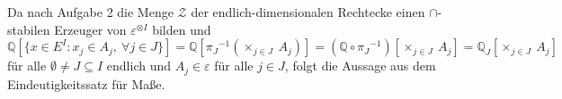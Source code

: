 Da nach Aufgabe 2 die Menge $\mathcal{Z}$ der endlich-dimensionalen Rechtecke einen $\cap$-stabilen Erzeuger von $\varepsilon^{ \otimes I}$ bilden und
\begin{equation*}
\mathbb{Q}[\lbrace x \in E^{I} : x_{j} \in A_{j}, \: \forall j \in J\rbrace] = \mathbb{Q}[{\pi_{J}}^{-1}(\times_{j \in J} \: A_{j})] = (\mathbb{Q} \circ {\pi_{J}}^{-1})[\times_{j \in J} \: A_{j}] = \mathbb{Q}_{J}[\times_{j \in J} \: A_{j}]  
\end{equation*}
für alle $\emptyset \neq J \subseteq I$ endlich und $A_{j} \in \varepsilon$ für alle $j \in J$, folgt die Aussage aus dem Eindeutigkeitssatz für Maße. 